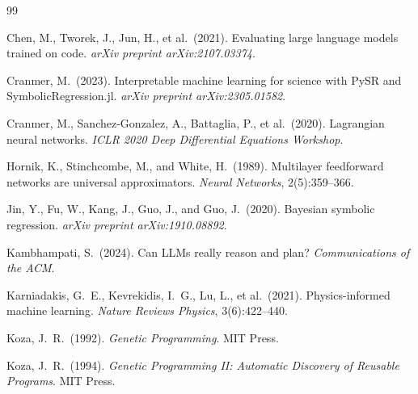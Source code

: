 \documentclass[twoside,11pt]{article}
\begin{document}

\begin{thebibliography}{99}

Chen, M., Tworek, J., Jun, H., et al.\ (2021).
Evaluating large language models trained on code.
\emph{arXiv preprint arXiv:2107.03374}.

Cranmer, M.\ (2023).
Interpretable machine learning for science with PySR and SymbolicRegression.jl.
\emph{arXiv preprint arXiv:2305.01582}.

Cranmer, M., Sanchez-Gonzalez, A., Battaglia, P., et al.\ (2020).
Lagrangian neural networks.
\emph{ICLR 2020 Deep Differential Equations Workshop}.

Hornik, K., Stinchcombe, M., and White, H.\ (1989).
Multilayer feedforward networks are universal approximators.
\emph{Neural Networks}, 2(5):359--366.

Jin, Y., Fu, W., Kang, J., Guo, J., and Guo, J.\ (2020).
Bayesian symbolic regression.
\emph{arXiv preprint arXiv:1910.08892}.

Kambhampati, S.\ (2024).
Can LLMs really reason and plan?
\emph{Communications of the ACM}.

Karniadakis, G.~E., Kevrekidis, I.~G., Lu, L., et al.\ (2021).
Physics-informed machine learning.
\emph{Nature Reviews Physics}, 3(6):422--440.

Koza, J.~R.\ (1992).
\emph{Genetic Programming}.
MIT Press.

Koza, J.~R.\ (1994).
\emph{Genetic Programming II: Automatic Discovery of Reusable Programs}.
MIT Press.


\end{thebibliography}
\end{document}
